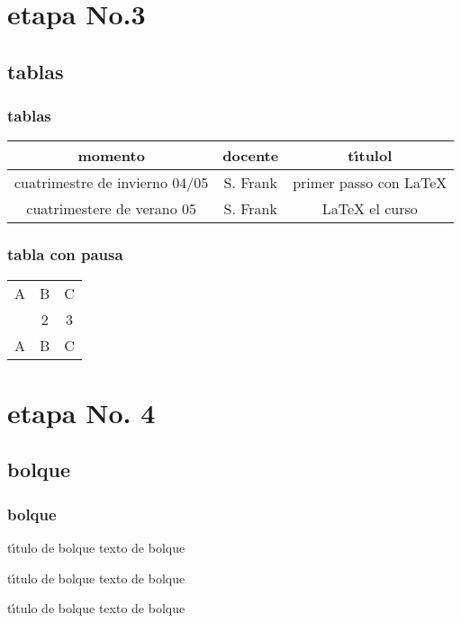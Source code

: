 \documentclass[hyperref={pdfpagelabels=false}]{beamer}
\begin{document}
\section{etapa No.3} 
\subsection{tablas}

\begin{frame}
\frametitle{tablas}
\begin{tabular}{|c|c|c|}
\hline
\textbf{momento} & \textbf{docente} & \textbf{t\'\i tulol} \\
\hline cuatrimestre de invierno 04/05 & S. Frank &  primer passo con  \LaTeX{}  \\
\hline
cuatrimestere de verano 05 & S. Frank & \LaTeX{} el curso \\
\hline
\end{tabular}
\end{frame}


\begin{frame}
\frametitle{tabla con pausa}
\begin{tabular}{c c c}
A & B & C \\ 
\pause 
1 & 2 & 3 \\  
\pause 
A & B & C \\ 
\end{tabular} 
\end{frame}

\section{etapa No. 4}
\subsection{bolque}

\begin{frame}
\frametitle{bolque}
\begin{block}{t\'\i tulo de bolque}
texto de bolque 
\end{block}

\begin{exampleblock}{t\'\i tulo de bolque}
texto de bolque 
\end{exampleblock}

\begin{alertblock}{t\'\i tulo de bolque}
texto de bolque 
\end{alertblock}
\end{frame}
\end{document}
